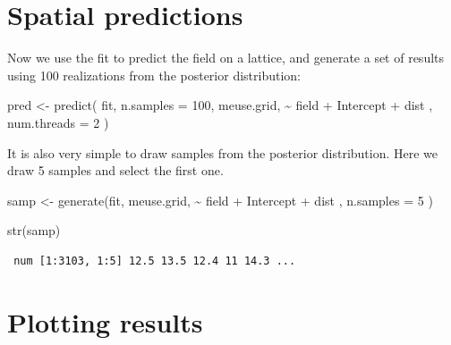 \documentclass[
  a4paper,
]{article}
\newenvironment{Shaded}{\begin{snugshade}}{\end{snugshade}}
\newcommand{\AttributeTok}[1]{\textcolor[rgb]{0.40,0.45,0.13}{#1}}
\newcommand{\DecValTok}[1]{\textcolor[rgb]{0.68,0.00,0.00}{#1}}
\newcommand{\FunctionTok}[1]{\textcolor[rgb]{0.28,0.35,0.67}{#1}}
\newcommand{\NormalTok}[1]{\textcolor[rgb]{0.00,0.23,0.31}{#1}}
\newcommand{\OtherTok}[1]{\textcolor[rgb]{0.00,0.23,0.31}{#1}}
\newcommand{\SpecialCharTok}[1]{\textcolor[rgb]{0.37,0.37,0.37}{#1}}
\begin{document}
\hypertarget{spatial-predictions}{%
\section{Spatial predictions}\label{spatial-predictions}}

Now we use the fit to predict the field on a lattice, and generate a set
of results using 100 realizations from the posterior distribution:

\begin{Shaded}
\begin{Highlighting}[]
\NormalTok{pred }\OtherTok{\textless{}{-}} \FunctionTok{predict}\NormalTok{(}
\NormalTok{  fit,}
  \AttributeTok{n.samples =} \DecValTok{100}\NormalTok{,}
\NormalTok{  meuse.grid,}
  \SpecialCharTok{\textasciitilde{}}\NormalTok{ field }\SpecialCharTok{+}\NormalTok{ Intercept }\SpecialCharTok{+}\NormalTok{ dist ,}
  \AttributeTok{num.threads =} \DecValTok{2}
\NormalTok{)}
\end{Highlighting}
\end{Shaded}

It is also very simple to draw samples from the posterior distribution.
Here we draw 5 samples and select the first one.

\begin{Shaded}
\begin{Highlighting}[]
\NormalTok{samp }\OtherTok{\textless{}{-}} \FunctionTok{generate}\NormalTok{(fit, }
\NormalTok{                 meuse.grid,}
                 \SpecialCharTok{\textasciitilde{}}\NormalTok{ field }\SpecialCharTok{+}\NormalTok{ Intercept }\SpecialCharTok{+}\NormalTok{ dist ,}
                 \AttributeTok{n.samples =} \DecValTok{5}
\NormalTok{)}

\FunctionTok{str}\NormalTok{(samp)}
\end{Highlighting}
\end{Shaded}

\begin{verbatim}
 num [1:3103, 1:5] 12.5 13.5 12.4 11 14.3 ...
\end{verbatim}

\begin{Shaded}
\end{Shaded}

\hypertarget{plotting-results}{%
\section{Plotting results}\label{plotting-results}}
\end{document}
